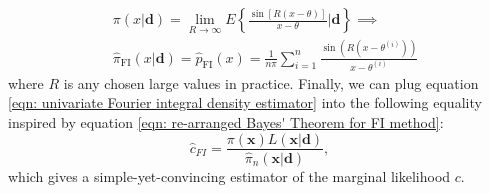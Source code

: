\documentclass[%
 reprint,
 amsmath,amssymb,
 aps,
]{revtex4-2}
\def\ybold{\mathbf{d}}
\def\xbold{\mathbf{x}}
\begin{document}
\begin{align} \label{eqn: univariate Fourier integral density estimator}
    & \pi(x|\ybold) = \lim_{R \to \infty} E\left\{\frac{\sin[R(x-\theta)]}{x-\theta} \bigg|\ybold\right\} \implies \\ & \hat{\pi}_\text{FI}(x|\ybold) = \hat{p}_\text{FI}(x) = \frac{1}{n\pi}\sum_{i = 1}^n \frac{\sin(R(x - \theta^{(i)}))}{x - \theta^{(i)}}
\end{align}
where $R$ is any chosen large values in practice. Finally, we can plug equation \eqref{eqn: univariate Fourier integral density estimator} into the following equality inspired by equation \eqref{eqn: re-arranged Bayes' Theorem for FI method}:
\begin{equation} \label{eqn: re-arranged Bayes' Theorem for FI method estimator}
    \hat{c}_{FI} = \frac{\pi(\xbold)L(\xbold | \ybold)}{\hat{\pi}_n (\xbold | \ybold)},
\end{equation}
which gives a simple-yet-convincing estimator of the marginal likelihood $c$.
\end{document}
